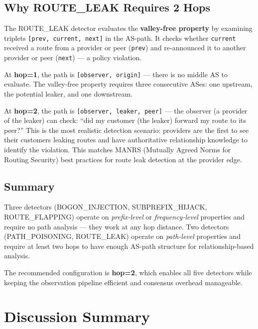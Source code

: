 \documentclass[11pt,a4paper]{article}
\begin{document}
\subsection{Why ROUTE\_LEAK Requires 2 Hops}

The ROUTE\_LEAK detector evaluates the \textbf{valley-free property} by examining
triplets \texttt{[prev, current, next]} in the AS-path. It checks whether
\texttt{current} received a route from a provider or peer (\texttt{prev}) and
re-announced it to another provider or peer (\texttt{next}) --- a policy violation.

At \textbf{hop=1}, the path is \texttt{[observer, origin]} --- there is no middle
AS to evaluate. The valley-free property requires three consecutive ASes:
one upstream, the potential leaker, and one downstream.

At \textbf{hop=2}, the path is \texttt{[observer, leaker, peer]} --- the observer
(a provider of the leaker) can check: ``did my customer (the leaker) forward my
route to its peer?'' This is the most realistic detection scenario: providers are
the first to see their customers leaking routes and have authoritative relationship
knowledge to identify the violation. This matches MANRS (Mutually Agreed Norms for
Routing Security) best practices for route leak detection at the provider edge.

\subsection{Summary}

Three detectors (BOGON\_INJECTION, SUBPREFIX\_HIJACK, ROUTE\_FLAPPING) operate on
\emph{prefix-level} or \emph{frequency-level} properties and require no path
analysis --- they work at any hop distance. Two detectors (PATH\_POISONING,
ROUTE\_LEAK) operate on \emph{path-level} properties and require at least two hops
to have enough AS-path structure for relationship-based analysis.

The recommended configuration is \textbf{hop=2}, which enables all five detectors
while keeping the observation pipeline efficient and consensus overhead manageable.

\section{Discussion Summary}
\end{document}

